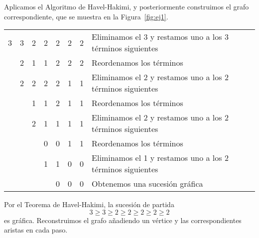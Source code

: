 \documentclass[12pt]{article}
\begin{document}
    \begin{ejercicio}
        Aplicamos el Algoritmo de Havel-Hakimi, y posteriormente construimos el grafo correspondiente, que se muestra en la Figura~\ref{fig:ej1}.

        \begin{table}[H]
            \centering
            \begin{tabular}{ccccccc|l}
                3 & 3 & 2 & 2 & 2 & 2 & 2 & Eliminamos el 3 y restamos uno a los 3 términos siguientes\\
                  & 2 & 1 & 1 & 2 & 2 & 2 & Reordenamos los términos\\
                  & 2 & 2 & 2 & 2 & 1 & 1 & Eliminamos el 2 y restamos uno a los 2 términos siguientes\\
                  &   & 1 & 1 & 2 & 1 & 1 & Reordenamos los términos\\
                  &   & 2 & 1 & 1 & 1 & 1 & Eliminamos el 2 y restamos uno a los 2 términos siguientes\\
                  &   &   & 0 & 0 & 1 & 1 & Reordenamos los términos\\
                  &   &   & 1 & 1 & 0 & 0 & Eliminamos el 1 y restamos uno a los 2 términos siguientes\\
                  &   &   &   & 0 & 0 & 0 & Obtenemos una sucesión gráfica
            \end{tabular}
        \end{table}
        Por el Teorema de Havel-Hakimi, la sucesión de partida $$3 \ge 3 \ge 2 \ge 2 \ge 2 \ge 2 \ge 2$$ es gráfica. Reconstruimos el grafo añadiendo un vértice y las correspondientes aristas en cada paso.

        \begin{figure}[H]
            \centering
            \label{fig:ej11}
        \end{figure}

        \begin{figure}[H]
            \centering
\end{figure}
\end{ejercicio}
\end{document}
